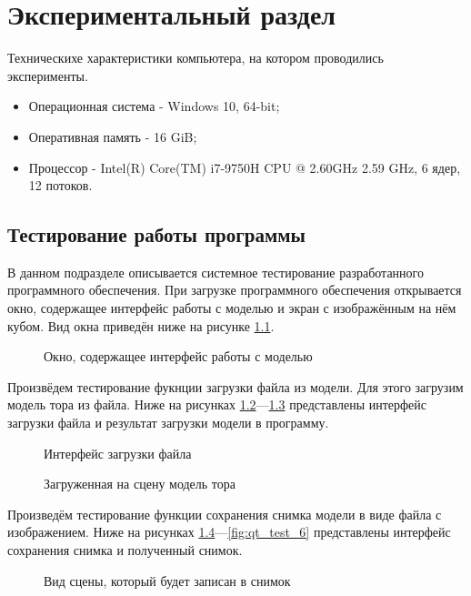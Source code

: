 \chapter{Экспериментальный раздел}
Техническихе характеристики компьютера, на котором проводились эксперименты.
\begin{itemize}
	\item Операционная система - Windows 10, 64-bit;
	\item Оперативная память - 16 GiB;
	\item Процессор - Intel(R) Core(TM) i7-9750H CPU @ 2.60GHz 2.59 GHz, 6 ядер, 12 потоков.
\end{itemize}

\section{Тестирование работы программы}
В данном подразделе описывается системное тестирование разработанного программного обеспечения. При загрузке программного обеспечения открывается окно, содержащее интерфейс работы с моделью и экран с изображённым на нём кубом. Вид окна приведён ниже на рисунке \ref{fig:qt_test_1}.
\begin{figure}[H]
	\caption{Окно, содержащее интерфейс работы с моделью}
	\label{fig:qt_test_1}
\end{figure}

Произвёдем тестирование фукнции загрузки файла из модели. Для этого загрузим модель тора из файла. Ниже на рисунках \ref{fig:qt_test_2}---\ref{fig:qt_test_3} представлены интерфейс загрузки файла и результат загрузки модели в программу.

\begin{figure}[H]
	\caption{Интерфейс загрузки файла}
	\label{fig:qt_test_2}
\end{figure}

\begin{figure}[H]
	\caption{Загруженная на сцену модель тора}
	\label{fig:qt_test_3}
\end{figure}

Произведём тестирование функции сохранения снимка модели в виде файла с изображением. Ниже на рисунках \ref{fig:qt_test_4}---\ref{fig:qt_test_6} представлены интерфейс сохранения снимка и полученный снимок.

\begin{figure}[H]
	\caption{Вид сцены, который будет записан в снимок}
	\label{fig:qt_test_4}
\end{figure}

